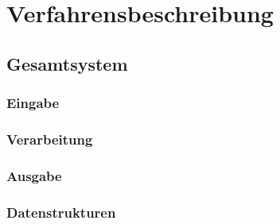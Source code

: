 \chapter{Verfahrensbeschreibung}\label{ch:verfahrensbeschreibung}

\section{Gesamtsystem}\label{sec:gesamtsystem}


\subsection{Eingabe}\label{subsec:eingabe}

\subsection{Verarbeitung}\label{subsec:verarbeitung}

\subsection{Ausgabe}\label{subsec:ausgabe}

\subsection{Datenstrukturen}\label{subsec:datenstrukt}
